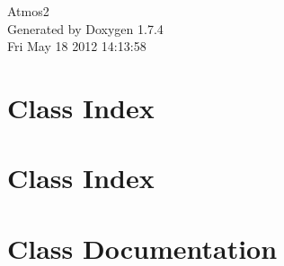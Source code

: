 \documentclass[a4paper]{book}
\begin{document}
\hypersetup{pageanchor=false}
\begin{titlepage}
\vspace*{7cm}
\begin{center}
{\Large Atmos2 }\\
\vspace*{1cm}
{\large Generated by Doxygen 1.7.4}\\
\vspace*{0.5cm}
{\small Fri May 18 2012 14:13:58}\\
\end{center}
\end{titlepage}
\clearemptydoublepage
{}
\tableofcontents
\clearemptydoublepage
{}
\hypersetup{pageanchor=true}
\chapter{Class Index}

\chapter{Class Index}

\chapter{Class Documentation}



























\printindex
\end{document}
